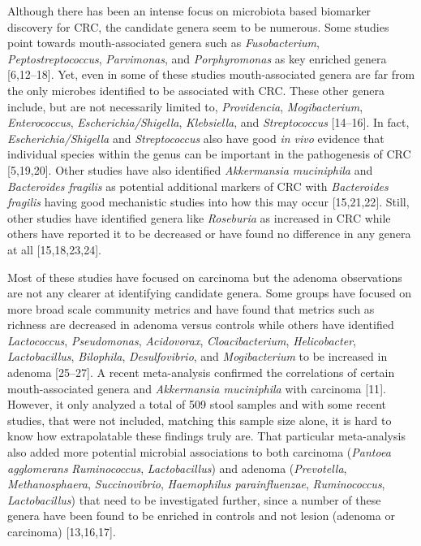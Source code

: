 \documentclass[12pt,]{article}
\begin{document}
Although there has been an intense focus on microbiota based biomarker
discovery for CRC, the candidate genera seem to be numerous. Some
studies point towards mouth-associated genera such as
\emph{Fusobacterium}, \emph{Peptostreptococcus}, \emph{Parvimonas}, and
\emph{Porphyromonas} as key enriched genera {[}6,12--18{]}. Yet, even in
some of these studies mouth-associated genera are far from the only
microbes identified to be associated with CRC. These other genera
include, but are not necessarily limited to, \emph{Providencia},
\emph{Mogibacterium}, \emph{Enterococcus}, \emph{Escherichia/Shigella},
\emph{Klebsiella}, and \emph{Streptococcus} {[}14--16{]}. In fact,
\emph{Escherichia/Shigella} and \emph{Streptococcus} also have good
\emph{in vivo} evidence that individual species within the genus can be
important in the pathogenesis of CRC {[}5,19,20{]}. Other studies have
also identified \emph{Akkermansia muciniphila} and \emph{Bacteroides
fragilis} as potential additional markers of CRC with \emph{Bacteroides
fragilis} having good mechanistic studies into how this may occur
{[}15,21,22{]}. Still, other studies have identified genera like
\emph{Roseburia} as increased in CRC while others have reported it to be
decreased or have found no difference in any genera at all
{[}15,18,23,24{]}.

Most of these studies have focused on carcinoma but the adenoma
observations are not any clearer at identifying candidate genera. Some
groups have focused on more broad scale community metrics and have found
that metrics such as richness are decreased in adenoma versus controls
while others have identified \emph{Lactococcus}, \emph{Pseudomonas},
\emph{Acidovorax}, \emph{Cloacibacterium}, \emph{Helicobacter},
\emph{Lactobacillus}, \emph{Bilophila}, \emph{Desulfovibrio}, and
\emph{Mogibacterium} to be increased in adenoma {[}25--27{]}. A recent
meta-analysis confirmed the correlations of certain mouth-associated
genera and \emph{Akkermansia muciniphila} with carcinoma {[}11{]}.
However, it only analyzed a total of 509 stool samples and with some
recent studies, that were not included, matching this sample size alone,
it is hard to know how extrapolatable these findings truly are. That
particular meta-analysis also added more potential microbial
associations to both carcinoma (\emph{Pantoea agglomerans}
\emph{Ruminococcus}, \emph{Lactobacillus}) and adenoma
(\emph{Prevotella}, \emph{Methanosphaera}, \emph{Succinovibrio},
\emph{Haemophilus parainfluenzae}, \emph{Ruminococcus},
\emph{Lactobacillus}) that need to be investigated further, since a
number of these genera have been found to be enriched in controls and
not lesion (adenoma or carcinoma) {[}13,16,17{]}.
\end{document}
